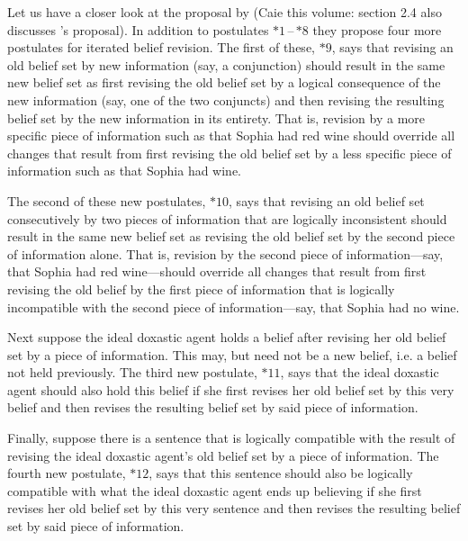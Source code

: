 Let us have a closer look at the proposal by \citet{dp97} (Caie this volume: section 2.4 also discusses \citealt{b96}'s proposal). In addition to postulates $*1$\,--\,$*8$ they propose four more postulates for iterated belief revision. The first of these, $*9$, says that revising an old belief set by new information (say, a conjunction) should result in the same new belief set as first revising the old belief set by a logical consequence of the new information (say, one of the two conjuncts) and then revising the resulting belief set by the new information in its entirety. That is, revision by a more specific piece of information such as that Sophia had red wine should override all changes that result from first revising the old belief set by a less specific piece of information such as that Sophia had wine.

The second of these new postulates, $*10$, says that revising an old belief set consecutively by two pieces of information that are logically inconsistent should result in the same new belief set as revising the old belief set by the second piece of information alone. That is, revision by the second piece of information---say, that Sophia had red wine---should override all changes that result from first revising the old belief by the first piece of information that is logically incompatible with the second piece of information---say, that Sophia had no wine.

Next suppose the ideal doxastic agent holds a belief after revising her old belief set by a piece of information. This may, but need not be a new belief, i.e. a belief not held previously. The third new postulate, $*11$, says that the ideal doxastic agent should also hold this belief if she first revises her old belief set by this very belief and then revises the resulting belief set by said piece of information.

Finally, suppose there is a sentence that is logically compatible with the result of revising the ideal doxastic agent's old belief set by a piece of information. The fourth new postulate, $*12$, says that this sentence should also be logically compatible with what the ideal doxastic agent ends up believing if she first revises her old belief set by this very sentence and then revises the resulting belief set by said piece of information.

